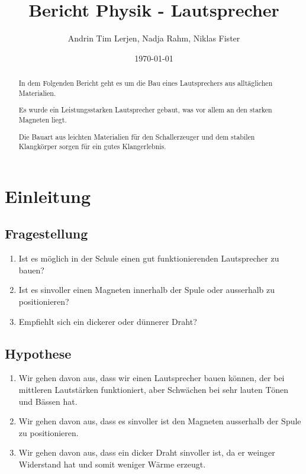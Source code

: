 \documentclass{report}
\title{\Huge\textbf{Bericht Physik - Lautsprecher}}
\author{Andrin Tim Lerjen, Nadja Rahm, Niklas Fister}
\date{\today}
\begin{document}
\maketitle

\newpage
\begin{abstract}
    In dem Folgenden Bericht geht es um die Bau eines Lautsprechers aus alltäglichen Materialien.

    Es wurde ein Leistungsstarken Lautsprecher gebaut, was vor allem an den starken Magneten liegt.

    Die Bauart aus leichten Materialien für den Schallerzeuger und dem stabilen Klangkörper sorgen für ein gutes Klangerlebnis.
    
\end{abstract}

\newpage
\tableofcontents

\newpage
{}
\setcounter{page}{1}

\chapter{Einleitung}
\section{Fragestellung}
\begin{enumerate}
    \item Ist es möglich in der Schule einen gut funktionierenden Lautsprecher zu bauen?
    \item Ist es sinvoller einen Magneten innerhalb der Spule oder ausserhalb zu positionieren?
    \item Empfiehlt sich ein dickerer oder dünnerer Draht?
\end{enumerate}
\section{Hypothese}
\begin{enumerate}
    \item Wir gehen davon aus, dass wir einen Lautsprecher bauen können, der bei mittleren Lautstärken funktioniert, aber Schwächen bei sehr lauten Tönen und Bässen hat.
    \item Wir gehen davon aus, dass es sinvoller ist den Magneten ausserhalb der Spule zu positionieren.
    \item Wir gehen davon aus, dass ein dicker Draht sinvoller ist, da er weinger Widerstand hat und somit weniger Wärme erzeugt.
\end{enumerate}
\end{document}

